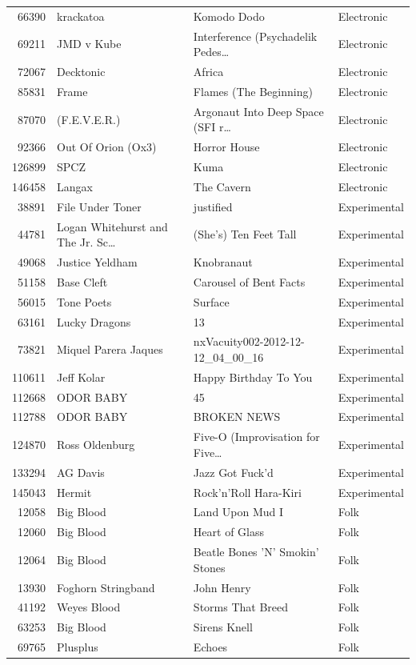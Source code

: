 \begin{footnotesize}
\begin{longtable}{@{}rlll@{}}
66390 & krackatoa & Komodo Dodo & Electronic \\
69211 & JMD v Kube & Interference (Psychadelik Pedes\ldots & Electronic \\
72067 & Decktonic & Africa & Electronic \\
85831 & Frame & Flames (The Beginning) & Electronic \\
87070 & (F.E.V.E.R.) & Argonaut Into Deep Space (SFI r\ldots & Electronic \\
92366 & Out Of Orion (Ox3) & Horror House & Electronic \\
126899 & SPCZ & Kuma & Electronic \\
146458 & Langax & The Cavern & Electronic \\
38891 & File Under Toner & justified & Experimental \\
44781 & Logan Whitehurst and The Jr. Sc\ldots & (She's) Ten Feet Tall & Experimental \\
49068 & Justice Yeldham & Knobranaut & Experimental \\
51158 & Base Cleft & Carousel of Bent Facts & Experimental \\
56015 & Tone Poets & Surface & Experimental \\
63161 & Lucky Dragons & 13 & Experimental \\
73821 & Miquel Parera Jaques & nxVacuity002-2012-12-12\_04\_00\_16 & Experimental \\
110611 & Jeff Kolar & Happy Birthday To You & Experimental \\
112668 & ODOR BABY & 45 & Experimental \\
112788 & ODOR BABY & BROKEN NEWS & Experimental \\
124870 & Ross Oldenburg & Five-O (Improvisation for Five\ldots & Experimental \\
133294 & AG Davis & Jazz Got Fuck'd & Experimental \\
145043 & Hermit & Rock'n'Roll Hara-Kiri & Experimental \\
12058 & Big Blood & Land Upon Mud I & Folk \\
12060 & Big Blood & Heart of Glass & Folk \\
12064 & Big Blood & Beatle Bones 'N' Smokin' Stones & Folk \\
13930 & Foghorn Stringband & John Henry & Folk \\
41192 & Weyes Blood & Storms That Breed & Folk \\
63253 & Big Blood & Sirens Knell & Folk \\
69765 & Plusplus & Echoes & Folk \\

\end{longtable}
\end{footnotesize}
